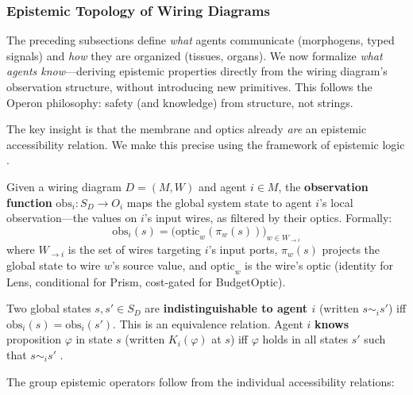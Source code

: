\subsubsection{Epistemic Topology of Wiring Diagrams}
\label{sec:epistemic-topology}

The preceding subsections define \textit{what} agents communicate (morphogens, typed signals) and \textit{how} they are organized (tissues, organs). We now formalize \textit{what agents know}---deriving epistemic properties directly from the wiring diagram's observation structure, without introducing new primitives. This follows the Operon philosophy: safety (and knowledge) from structure, not strings.

The key insight is that the membrane and optics already \textit{are} an epistemic accessibility relation. We make this precise using the framework of epistemic logic \cite{fagin1995reasoning}.

\begin{definition}
\label{def:observation-function}
Given a wiring diagram $D = (M, W)$ and agent $i \in M$, the \textbf{observation function} $\mathrm{obs}_i: S_D \to O_i$ maps the global system state to agent $i$'s local observation---the values on $i$'s input wires, as filtered by their optics. Formally:
\begin{equation}
\mathrm{obs}_i(s) = \bigl(\mathrm{optic}_w(\pi_{w}(s))\bigr)_{w \in W_{\to i}}
\label{eq:observation-function}
\end{equation}
where $W_{\to i}$ is the set of wires targeting $i$'s input ports, $\pi_w(s)$ projects the global state to wire $w$'s source value, and $\mathrm{optic}_w$ is the wire's optic (identity for Lens, conditional for Prism, cost-gated for BudgetOptic).
\end{definition}

\begin{definition}
\label{def:epistemic-indistinguishability}
Two global states $s, s' \in S_D$ are \textbf{indistinguishable to agent $i$} (written $s \sim_i s'$) iff $\mathrm{obs}_i(s) = \mathrm{obs}_i(s')$. This is an equivalence relation. Agent $i$ \textbf{knows} proposition $\varphi$ in state $s$ (written $K_i(\varphi)$ at $s$) iff $\varphi$ holds in all states $s'$ such that $s \sim_i s'$ \cite{fagin1995reasoning}.
\end{definition}

The group epistemic operators follow from the individual accessibility relations:


